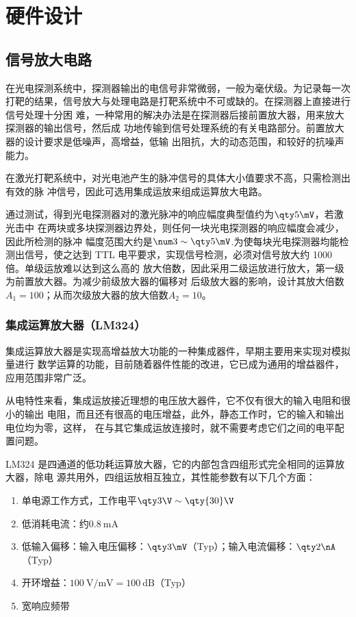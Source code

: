 \chapter{硬件设计}

\section{信号放大电路}

在光电探测系统中，探测器输出的电信号非常微弱，一般为毫伏级。为记录每一次打靶的结果，信号放大与处理电路是打靶系统中不可或缺的。在探测器上直接进行信号处理十分困
难，一种常用的解决办法是在探测器后接前置放大器，用来放大探测器的输出信号，然后成
功地传输到信号处理系统的有关电路部分。前置放大器的设计要求是低噪声，高增益，低输
出阻抗，大的动态范围，和较好的抗噪声能力。

在激光打靶系统中，对光电池产生的脉冲信号的具体大小值要求不高，只需检测出有效的脉
冲信号，因此可选用集成运放来组成运算放大电路。

通过测试，得到光电探测器对的激光脉冲的响应幅度典型值约为$\qty5\mV$，若激光击中
在两块或多块探测器边界处，则任何一块光电探测器的响应幅度会减少，因此所检测的脉冲
幅度范围大约是$\num3\sim\qty5\mV$.为使每块光电探测器均能检测出信号，使之达到
TTL 电平要求，实现信号检测，必须对信号放大约 1000 倍。单级运放难以达到这么高的
放大倍数，因此采用二级运放进行放大，第一级为前置放大器。为减少前级放大器的偏移对
后级放大器的影响，设计其放大倍数$A_1=100$；从而次级放大器的放大倍数$A_2=10$。

\subsection{集成运算放大器（LM324）}

集成运算放大器是实现高增益放大功能的一种集成器件\cite{cn9}，早期主要用来实现对模拟量进行
数学运算的功能，目前随着器件性能的改进，它已成为通用的增益器件，应用范围非常广泛。

从电特性来看，集成运放接近理想的电压放大器件，它不仅有很大的输入电阻和很小的输出
电阻，而且还有很高的电压增益，此外，静态工作时，它的输入和输出电位均为零，这样，
在与其它集成运放连接时，就不需要考虑它们之间的电平配置问题。

LM324 是四通道的低功耗运算放大器，它的内部包含四组形式完全相同的运算放大器，除电
源共用外，四组运放相互独立，其性能参数有以下几个方面：

\begin{enumerate}
  \item 单电源工作方式，工作电平$\qty3\V\sim\qty{30}\V$
  \item 低消耗电流：约$\qty{0.8}\mA$
  \item 低输入偏移：输入电压偏移：$\qty3\mV$（Typ）；输入电流偏移：$\qty2\nA$（Typ）
  \item 开环增益：$\qty{100}\V/\unit\mV=\qty{100}\dB$（Typ）
  \item 宽响应频带
\end{enumerate}

